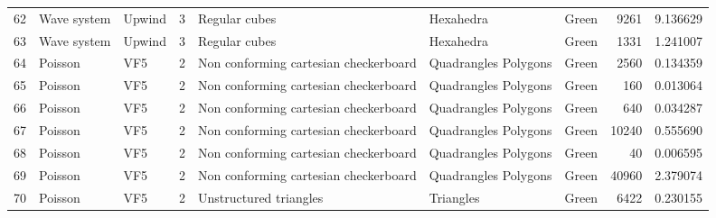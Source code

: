 \begin{tabular}{lllrlllrr}
62  &       Wave system &                         Upwind &               3 &                             Regular cubes &              Hexahedra  &                                Green &                     9261 &                         9.136629 \\
63  &       Wave system &                         Upwind &               3 &                             Regular cubes &              Hexahedra  &                                Green &                     1331 &                         1.241007 \\
64  &           Poisson &                            VF5 &               2 &     Non conforming cartesian checkerboard &   Quadrangles Polygons  &                                Green &                     2560 &                         0.134359 \\
65  &           Poisson &                            VF5 &               2 &     Non conforming cartesian checkerboard &   Quadrangles Polygons  &                                Green &                      160 &                         0.013064 \\
66  &           Poisson &                            VF5 &               2 &     Non conforming cartesian checkerboard &   Quadrangles Polygons  &                                Green &                      640 &                         0.034287 \\
67  &           Poisson &                            VF5 &               2 &     Non conforming cartesian checkerboard &   Quadrangles Polygons  &                                Green &                    10240 &                         0.555690 \\
68  &           Poisson &                            VF5 &               2 &     Non conforming cartesian checkerboard &   Quadrangles Polygons  &                                Green &                       40 &                         0.006595 \\
69  &           Poisson &                            VF5 &               2 &     Non conforming cartesian checkerboard &   Quadrangles Polygons  &                                Green &                    40960 &                         2.379074 \\
70  &           Poisson &                            VF5 &               2 &                    Unstructured triangles &              Triangles  &                                Green &                     6422 &                         0.230155 \\

\end{tabular}
